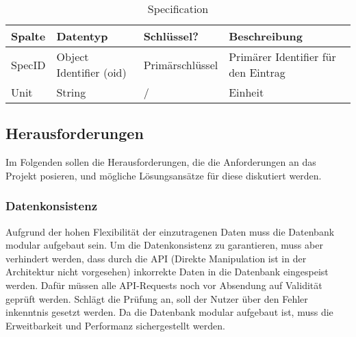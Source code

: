 \begin{table}[hbt]
    \centering
    \caption{Specification}
    \begin{tabularx}{\textwidth}{l l l X}
        \toprule
        \textbf{Spalte} & \textbf{Datentyp} & \textbf{Schlüssel?} & \textbf{Beschreibung} \\
        \midrule
        SpecID & Object Identifier (oid) & Primärschlüssel & Primärer Identifier für den Eintrag\\
        Unit & String & / & Einheit\\
        \bottomrule
    \end{tabularx}
    \label{tab:formulation}
\end{table}

\subsection{Herausforderungen}
Im Folgenden sollen die Herausforderungen, die die Anforderungen an das Projekt posieren, und mögliche Lösungsansätze für diese diskutiert
werden. 
\subsubsection{Datenkonsistenz}
Aufgrund der hohen Flexibilität der einzutragenen Daten muss die Datenbank modular aufgebaut sein. Um die Datenkonsistenz zu garantieren, 
muss aber verhindert werden, dass durch die API (Direkte Manipulation ist in der Architektur nicht vorgesehen) inkorrekte Daten in die Datenbank
eingespeist werden. Dafür müssen alle API-Requests noch vor Absendung auf Validität geprüft werden. Schlägt die Prüfung an, soll der Nutzer über den 
Fehler inkenntnis gesetzt werden. Da die Datenbank modular aufgebaut ist, muss die Erweitbarkeit und Performanz sichergestellt werden.
